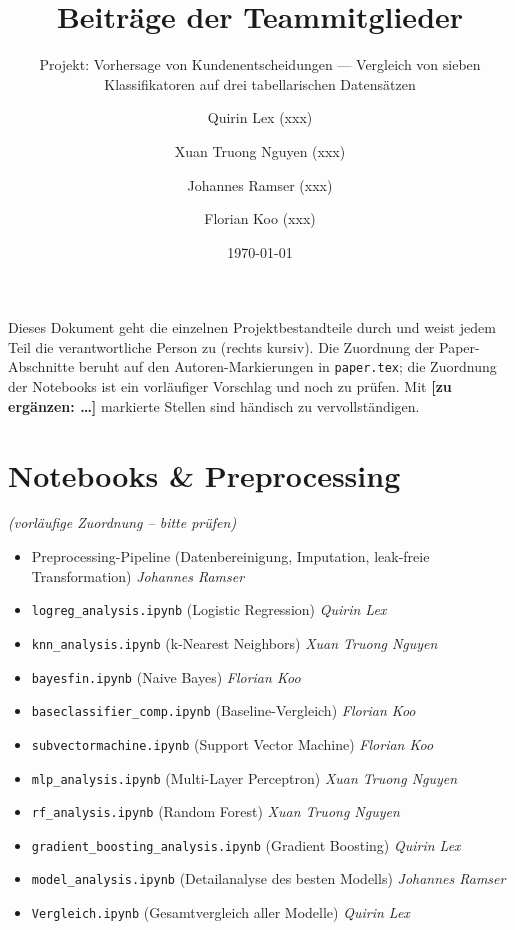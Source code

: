 \documentclass[11pt]{scrartcl}
\newcommand{\todo}[1]{\textbf{[zu ergänzen: #1]}}
\newcommand{\by}[1]{\hfill\textit{#1}}
\begin{document}
\title{Beiträge der Teammitglieder}
\subtitle{Projekt: Vorhersage von Kundenentscheidungen --- Vergleich von sieben
Klassifikatoren auf drei tabellarischen Datensätzen}
\author{
	Quirin Lex (xxx) \and
	Xuan Truong Nguyen (xxx) \and
	Johannes Ramser (xxx) \and
	Florian Koo (xxx)
}
\date{\today}
\maketitle

\noindent
Dieses Dokument geht die einzelnen Projektbestandteile durch und weist jedem Teil die
verantwortliche Person zu (rechts kursiv). Die Zuordnung der Paper-Abschnitte beruht auf
den Autoren-Markierungen in \texttt{paper.tex}; die Zuordnung der Notebooks ist ein
vorläufiger Vorschlag und noch zu prüfen. Mit \todo{\dots} markierte Stellen sind
händisch zu vervollständigen.

\section{Notebooks \& Preprocessing}
\emph{(vorläufige Zuordnung -- bitte prüfen)}
\begin{itemize}
	\item Preprocessing-Pipeline (Datenbereinigung, Imputation, leak-freie Transformation) \by{Johannes Ramser}
	\item \texttt{logreg\_analysis.ipynb} (Logistic Regression) \by{Quirin Lex}
	\item \texttt{knn\_analysis.ipynb} (k-Nearest Neighbors) \by{Xuan Truong Nguyen}
	\item \texttt{bayesfin.ipynb} (Naive Bayes) \by{Florian Koo}
	\item \texttt{baseclassifier\_comp.ipynb} (Baseline-Vergleich) \by{Florian Koo}
	\item \texttt{subvectormachine.ipynb} (Support Vector Machine) \by{Florian Koo}
	\item \texttt{mlp\_analysis.ipynb} (Multi-Layer Perceptron) \by{Xuan Truong Nguyen}
	\item \texttt{rf\_analysis.ipynb} (Random Forest) \by{Xuan Truong Nguyen}
	\item \texttt{gradient\_boosting\_analysis.ipynb} (Gradient Boosting) \by{Quirin Lex}
	\item \texttt{model\_analysis.ipynb} (Detailanalyse des besten Modells) \by{Johannes Ramser}
	\item \texttt{Vergleich.ipynb} (Gesamtvergleich aller Modelle) \by{Quirin Lex}
\end{itemize}
\end{document}
